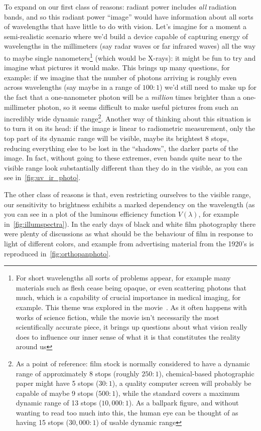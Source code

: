 To expand on our first class of reasons: radiant power includes \emph{all} radiation
bands, and so this radiant power ``image'' would have information about all sorts 
of wavelengths that have little to do with vision. 
Let's imagine for a moment a semi-realistic scenario where we'd build a device 
capable of capturing energy of wavelengths in the millimeters (say radar waves 
or far infrared waves) all the way to maybe single nanometers\footnote{
	For short wavelengths all sorts of problems appear, for example many materials 
	such as flesh cease being opaque, or even scattering photons that much, 
	which is a capability of crucial importance in medical imaging, for example.
	This theme was explored in the movie~\cite{x63}. 
	As it often happens with works of science fiction, while the movie isn't 
	necessarily the most scientifically accurate piece, it brings up questions 
	about what vision really does to influence our inner sense
	of what it is that constitutes the reality around us} 
(which would be X-rays): it might be fun to try and imagine what pictures it would make.
This brings up many questions, for example: if we imagine that the number of photons arriving
is roughly even across wavelengths (say maybe in a range of $100:1$) we'd still need to make
up for the fact that a one-nanometer photon will be a \emph{million} times brighter than a one-millimeter
photon, so it seems difficult to make useful pictures from such an incredibly wide dynamic range\footnote{
	As a point of reference: film stock is normally considered to have a dynamic range of approximately
	8 \glspl{stop} (roughly $250:1$), chemical-based photographic paper might have 5 \glspl{stop} ($30:1$), 
	a quality computer screen will probably be capable of maybe 9 \glspl{stop} ($500:1$), while
	the  standard covers a maximum dynamic range of 13 \glspl{stop} ($10,000:1$).
	As a ballpark figure, and without wanting to read too much into this, the human eye can be
	thought of as having 15 \glspl{stop} ($30,000:1$) of usable dynamic range
}. Another way of thinking about this situation is to turn it on its head: if the image is
linear to radiometric measurement, only the top part of its dynamic range will be visible,
maybe its brightest 8 \glspl{stop}, reducing everything else to be lost in the ``shadows'',
the darker parts of the image.
In fact, without going to these extremes, even bands quite near to the visible range look 
substantially different than they do in the visible, as you can see in~\cref{fig:uv_ir_photo}. 

The other class of reasons is that, even restricting ourselves to the visible range, 
our sensitivity to brightness exhibits a marked dependency on the wavelength 
(as you can see in a plot of the luminous efficiency 
function $V(\lambda)$, for example in~\cref{fig:illumspectra}).
In the early days of black and white film photography there were plenty of discussions as what
should be the behaviour of film in response to light of different colors, 
and example from advertising material from the 1920's is reproduced in~\cref{fig:orthopanphoto}.


